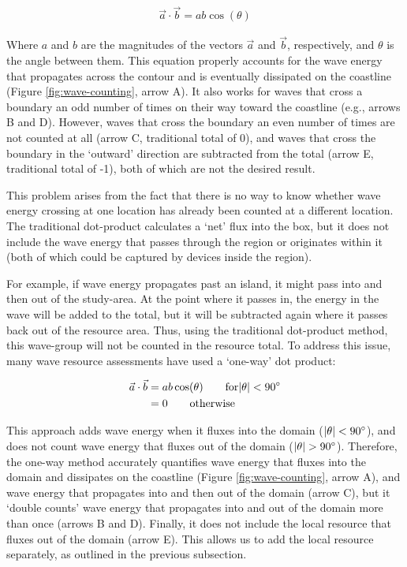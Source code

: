 \begin{align}
  \vec{a} \cdot \vec{b} = a b \cos(\theta)
\end{align}

Where $a$ and $b$ are the magnitudes of the vectors $\vec{a}$ and $\vec{b}$, respectively, and $\theta$ is the angle between them. This equation properly accounts for the wave energy that propagates across the contour and is eventually dissipated on the coastline (Figure \ref{fig:wave-counting}, arrow A). It also works for waves that cross a boundary an odd number of times on their way toward the coastline (e.g., arrows B and D). However, waves that cross the boundary an even number of times are not counted at all (arrow C, traditional total of 0), and waves that cross the boundary in the ‘outward’ direction are subtracted from the total (arrow E, traditional total of -1), both of which are not the desired result.

This problem arises from the fact that there is no way to know whether wave energy crossing at one location has already been counted at a different location. The traditional dot-product calculates a ‘net’ flux into the box, but it does not include the wave energy that passes through the region or originates within it (both of which could be captured by devices inside the region).

For example, if wave energy propagates past an island, it might pass into and then out of the study-area. At the point where it passes in, the energy in the wave will be added to the total, but it will be subtracted again where it passes back out of the resource area. Thus, using the traditional dot-product method, this wave-group will not be counted in the resource total. To address this issue, many wave resource assessments have used a ‘one-way’ dot product:

\begin{align} \label{eqn:oneway}
\begin{split}
  \vec{a} \cdot \vec{b} & = ab \cos(\theta) \qquad \mathrm{for} |\theta| < 90 ^\circ\\
      & = 0 \qquad \mathrm{otherwise}
  \end{split}
\end{align}

This approach adds wave energy when it fluxes into the domain ($|\theta| < 90^\circ$), and does not count wave energy that fluxes out of the domain ($|\theta| > 90^\circ$). Therefore, the one-way method accurately quantifies wave energy that fluxes into the domain and dissipates on the coastline (Figure \ref{fig:wave-counting}, arrow A), and wave energy that propagates into and then out of the domain (arrow C), but it ‘double counts’ wave energy that propagates into and out of the domain more than once (arrows B and D). Finally, it does not include the local resource that fluxes out of the domain (arrow E). This allows us to add the local resource separately, as outlined in the previous subsection.


